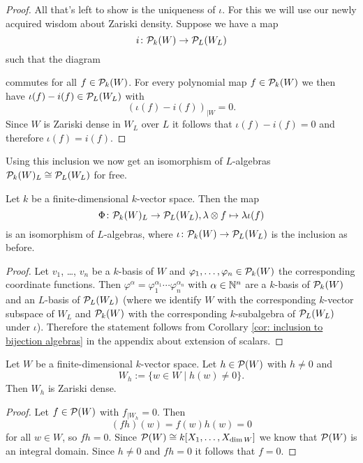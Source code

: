 \begin{proof}
 All that’s left to show is the uniqueness of $\iota$. For this we will use our newly acquired wisdom about Zariski density. Suppose we have a map
 \[
  i \colon \mathcal{P}_k(W) \to \mathcal{P}_L(W_L)
 \]
 such that the diagram
  \begin{center}
 \end{center}
 commutes for all $f \in \mathcal{P}_k(W)$. For every polynomial map $f \in \mathcal{P}_k(W)$ we then have \mbox{$\iota(f)-i(f) \in \mathcal{P}_L(W_L)$} with
 \[
  \left( \iota(f)-i(f) \right)_{|W} = 0.
 \]
 Since $W$ is Zariski dense in $W_L$ over $L$ it follows that $\iota(f) - i(f) = 0$ and therefore $\iota(f) = i(f)$.
\end{proof}


Using this inclusion we now get an isomorphism of $L$-algebras $\mathcal{P}_k(W)_L \cong \mathcal{P}_L(W_L)$ for free.


\begin{prop}
 Let $k$ be a finite-dimensional $k$-vector space. Then the map
 \[
  \Phi \colon \mathcal{P}_k(W)_L \to \mathcal{P}_L(W_L), \lambda \otimes f \mapsto \lambda \iota(f)
 \]
 is an isomorphism of $L$-algebras, where $\iota \colon \mathcal{P}_k(W) \to \mathcal{P}_L(W_L)$ is the inclusion as before.
\end{prop}
\begin{proof}
 Let $v_1$, \dots, $v_n$ be a $k$-basis of $W$ and $\varphi_1, \dotsc, \varphi_n \in \mathcal{P}_k(W)$ the corresponding coordinate functions. Then $\varphi^\alpha = \varphi_1^{\alpha_1} \dotsm \varphi_n^{\alpha_n}$ with $\alpha \in \mathbb{N}^n$ are a $k$-basis of $\mathcal{P}_k(W)$ and an $L$-basis of $\mathcal{P}_L(W_L)$ (where we identify $W$ with the corresponding $k$-vector subspace of $W_L$ and $\mathcal{P}_k(W)$ with the corresponding $k$-subalgebra of $\mathcal{P}_L(W_L)$ under $\iota$). Therefore the statement follows from Corollary \ref{cor: inclusion to bijection algebras} in the appendix about extension of scalars.
\end{proof}




\begin{lem}
 Let $W$ be a finite-dimensional $k$-vector space. Let $h \in \mathcal{P}(W)$ with $h \neq 0$ and
 \[
  W_h := \{w \in W \mid h(w) \neq 0\}.
 \]
 Then $W_h$ is Zariski dense.
\end{lem}
\begin{proof}
 Let $f \in \mathcal{P}(W)$ with $f_{|W_h} = 0$. Then
 \[
  (fh)(w) = f(w)h(w) = 0
 \]
 for all $w \in W$, so $fh = 0$. Since $\mathcal{P}(W) \cong k[X_1, \dotsc, X_{\dim W}]$ we know that $\mathcal{P}(W)$ is an integral domain. Since $h \neq 0$ and $fh = 0$ it follows that $f = 0$.
\end{proof}


